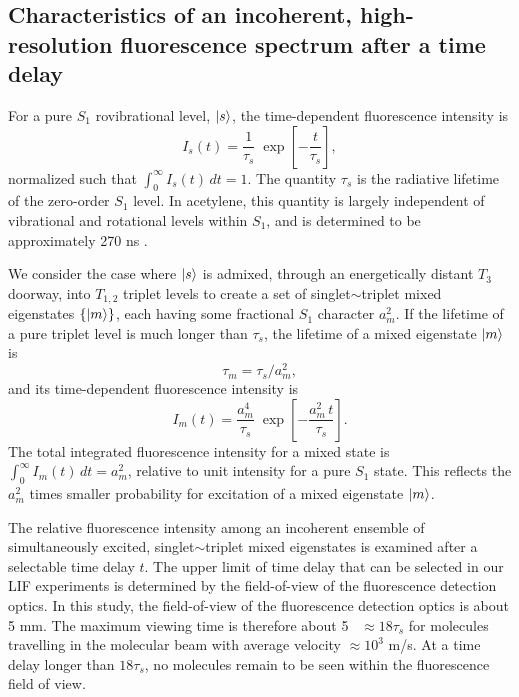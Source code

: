 \subsection{Characteristics of an incoherent, high-resolution
  fluorescence spectrum after a time delay}

For a pure $S_1$ rovibrational level, $\mathinner{|{s}\rangle}$, the time-dependent
fluorescence intensity is
\begin{equation}
  I_s(t) = \frac{1}{\tau_s} \;
           \exp \left[
             -\frac{t}{ \tau_s} 
           \right],
\end{equation}
normalized such that $\int_0^{\infty} I_s(t) \, dt = 1$.  The quantity
$\tau_s$ is the radiative lifetime of the zero-order $S_1$ level.  In
acetylene, this quantity is largely independent of vibrational and
rotational levels within $S_1$, and is determined to be approximately
270 ns \cite{ochi91, stephenson84}.

We consider the case where $\mathinner{|{s}\rangle}$ is admixed, through an
energetically distant $T_3$ doorway, into $T_{1,2}$ triplet levels to
create a set of singlet$\sim$triplet mixed eigenstates $\lbrace
\mathinner{|{m}\rangle} \rbrace$, each having some fractional $S_1$ character $a_m^2$.
If the lifetime of a pure triplet level is much longer than $\tau_s$,
the lifetime of a mixed eigenstate $\mathinner{|{m}\rangle}$ is
\begin{equation}
  \label{eq:tau-m}
  \tau_m = \tau_s / a_m^2,
\end{equation}
and its time-dependent fluorescence intensity is
\begin{equation}
  \label{eq:int-m}
  I_m(t) = \frac{a_m^4}{\tau_s} \;
           \exp \left[
             -\frac{a_m^2 \, t}{\tau_s} 
           \right].
\end{equation}
The total integrated fluorescence intensity for a mixed state is
$\int_0^{\infty} I_m(t) \, dt = a_m^2$, relative to unit intensity for
a pure $S_1$ state.  This reflects the $a_m^2$ times smaller
probability for excitation of a mixed eigenstate $\mathinner{|{m}\rangle}$.

The relative fluorescence intensity among an incoherent ensemble of
simultaneously excited, singlet$\sim$triplet mixed eigenstates is
examined after a selectable time delay $t$.  The upper limit of time
delay that can be selected in our LIF experiments is determined by the
field-of-view of the fluorescence detection optics.  In this study,
the field-of-view of the fluorescence detection optics is about 5 mm.
The maximum viewing time is therefore about 5 \microsec\ $\approx
18\tau_s$ for molecules travelling in the molecular beam with average
velocity $\approx 10^3$ m/s.  At a time delay longer than $18\tau_s$,
no molecules remain to be seen within the fluorescence field of view.

